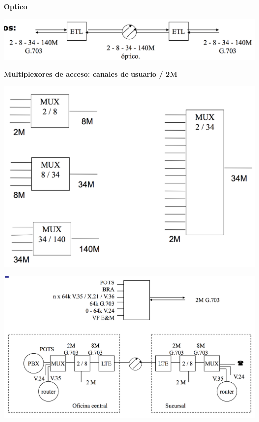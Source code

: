 \documentclass[10pt,portrait, twocolumn]{article}
\begin{document}
\textbf{Optico}

	\begin{center}
		\includegraphics[scale=0.2]{images/Optico}
	\end{center}

\textbf{Multiplexores de acceso: canales de usuario / 2M}

	\begin{center}
		\includegraphics[scale=0.2]{images/Mux}
	\end{center}

	\begin{center}
		\includegraphics[scale=0.2]{images/MuxTerminal}
	\end{center}
\end{document}
